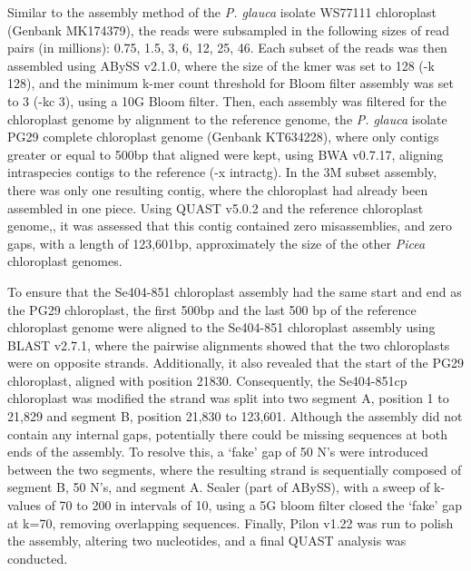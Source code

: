 \documentclass[titlepage,11pt, oneside]{article}   	%
\begin{document}
Similar to the assembly method of the \textit{P. glauca} isolate WS77111 chloroplast (Genbank MK174379), the reads were subsampled in the following sizes of read pairs (in millions): 0.75, 1.5, 3, 6, 12, 25, 46. Each subset of the reads was then assembled using ABySS v2.1.0, where the size of the kmer was set to 128 (-k 128), and the minimum k-mer count threshold for Bloom filter assembly was set to 3 (-kc 3), using a 10G Bloom filter. Then, each assembly was filtered for the chloroplast genome by alignment to the reference genome, the \textit{P. glauca} isolate PG29 complete chloroplast genome (Genbank KT634228), where only contigs greater or equal to 500bp that aligned were kept, using BWA v0.7.17, aligning intraspecies contigs to the reference (-x intractg). In the 3M subset assembly, there was only one resulting contig, where the chloroplast had already been assembled in one piece. Using QUAST v5.0.2 and the reference chloroplast genome,, it was assessed that this contig contained zero misassemblies, and zero gaps, with a length of 123,601bp, approximately the size of the other \textit{Picea} chloroplast genomes. 
\newline
\par
To ensure that the Se404-851 chloroplast assembly had the same start and end as the PG29 chloroplast, the first 500bp and the last 500 bp of the reference chloroplast genome were aligned to the Se404-851 chloroplast assembly using BLAST v2.7.1, where the pairwise alignments showed that the two chloroplasts were on opposite strands. Additionally, it also revealed that the start of the PG29 chloroplast, aligned with position 21830. Consequently, the Se404-851cp chloroplast was modified the strand was split into two segment A, position 1 to 21,829 and segment B, position 21,830 to 123,601. Although the assembly did not contain any internal gaps, potentially there could be missing sequences at both ends of the assembly. To resolve this, a ‘fake’ gap of 50 N’s were introduced between the two segments, where the resulting strand is sequentially composed of segment B, 50 N’s, and segment A. Sealer (part of ABySS), with a sweep of k-values of 70 to 200 in intervals of 10, using a 5G bloom filter closed the ‘fake’ gap at k=70, removing overlapping sequences. Finally, Pilon v1.22 was run to polish the assembly, altering two nucleotides, and a final QUAST analysis was conducted.
\newline
\par
\end{document}
